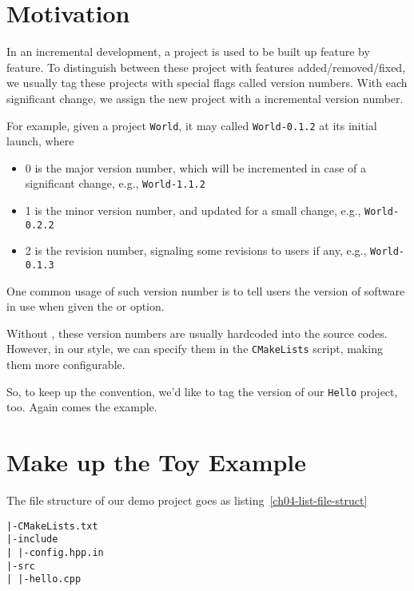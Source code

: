 \section{Motivation}
In an incremental development, a project is used to be built up feature by feature. To distinguish between these project with features added/removed/fixed, we usually tag these projects with special flags called version numbers. With each significant change, we assign the new project with a incremental version number.\par
For example, given a project \texttt{World}, it may called \texttt{World-0.1.2} at its initial launch, where
\begin{itemize}  
  \item 0 is the major version number, which will be incremented in case of a significant change, e.g., \texttt{World-1.1.2}
  \item 1 is the minor version number, and updated for a small change, e.g., \texttt{World-0.2.2}
  \item 2 is the revision number, signaling some revisions to users if any, e.g., \texttt{World-0.1.3}
\end{itemize}  
One common usage of such version number is to tell users the version of software in use when given the  or  option. \par 
Without , these version numbers are usually hardcoded into the source codes. However, in our  style, we can specify them in the \texttt{CMakeLists} script, making them more configurable. \par
So, to keep up the convention, we'd like to tag the version of our \texttt{Hello} project, too. Again comes the example.
\section{Make up the Toy Example}
The file structure of our demo project goes as listing~\ref{ch04-list-file-struct} \par
\begin{lstlisting}[caption={File structure of the toy example},label=ch04-list-file-struct]
|-CMakeLists.txt
|-include
| |-config.hpp.in
|-src
| |-hello.cpp
\end{lstlisting}

